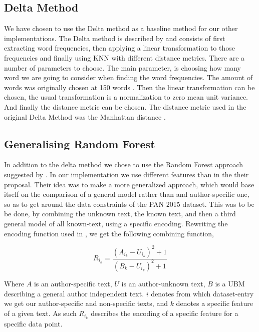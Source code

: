 \subsection{Delta Method} \label{subsec:method:delta_method}

We have chosen to use the Delta method as a baseline method for our other
implementations. The Delta method is described by \cite{evert2015towards}
and consists of first extracting word frequencies, then applying a linear
transformation to those frequencies and finally using \gls{KNN} with different
distance metrics. There are a number of parameters to choose. The main
parameter, is choosing how many word we are going to consider when finding
the word frequencies. The amount of words was originally chosen at 150 words
\cite{evert2015towards}. Then the linear transformation can be chosen, the
usual transformation is a normalization to zero mean unit variance. And finally
the distance metric can be chosen. The distance metric used in the original
Delta Method was the Manhattan distance \cite{evert2015towards}.

\subsection{Generalising Random Forest}
\label{subsec:method:generalising_random_forest} In addition to the delta method
we chose to use the Random Forest approach suggested by \cite{pacheco2015}.
In our implementation we use different features than in the their proposal.
Their idea was to make a more generalized approach, which would base itself
on the comparison of a general model rather than and author-specific one,
so as to get around the data constraints of the PAN 2015 dataset.
This was to be be done, by combining the unknown text, the known text, and
then a third general model of all known-text, using a specific encoding.
Rewriting the encoding function used
in \cite{pacheco2015}, we get the following combining function,

\begin{equation}
    R_{i_k} = \frac{(A_{i_k}-U_{i_k})^2+1}{(B_k-U_{i_k})^2+1}
\end{equation}

Where $A$ is an author-specific text, $U$ is an author-unknown text, $B$ is a
\gls{UBM} describing a general author independent text. $i$ denotes from which
dataset-entry we get our author-specific and non-specific texts, and $k$ denotes a
specific feature of a given text. As such $R_{i_k}$ describes the encoding of a
specific feature for a specific data point.

